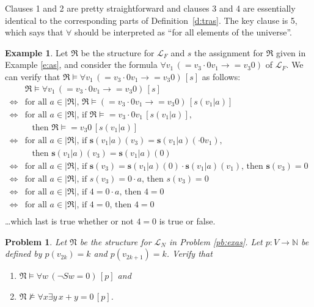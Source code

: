 \documentclass[12pt]{amsbook}
\newcommand{\nmodels}{\nvDash}
\theoremstyle{plain}
\newtheorem{prob}[thm]{Problem}
\theoremstyle{definition}
\newtheorem{exmp}{Example}[chapter]
\theoremstyle{remark}
\begin{document}
Clauses 1 and 2 are pretty straightforward and clauses 3 and 4 are essentially identical to the corresponding parts of Definition~\ref{d:tras}.  The key clause is 5,  which says that $\forall$ should be interpreted as ``for all elements of the universe''.  

\begin{exmp}
Let $\mathfrak{R}$ be the structure for $\mathcal{L}_F$ and $s$ the assignment for $\mathfrak{R}$ given in Example \ref{e:as},  and consider the formula $\forall v_1\, (= v_3 \cdot 0 v_1 \to = v_3 0)$ of $\mathcal{L}_F$.  We can verify that $\mathfrak{R} \models \forall v_1\, (= v_3 \cdot 0 v_1 \to = v_3 0) \, [s]$ as follows:
\[
\begin{aligned}
\mbox{} &\mathfrak{R} \models \forall v_1\, (= v_3 \cdot 0 v_1 \to = v_3 0) \, [s] \\
\iff &\text{for all $a \in |\mathfrak{R}|$,\ } \mathfrak{R} \models (= v_3 \cdot 0 v_1 \to = v_3 0) \, [s(v_1|a)]  \\
\iff &\text{for all $a \in |\mathfrak{R}|$, if $\mathfrak{R} \models  = v_3 \cdot 0 v_1 \, [s(v_1|a)]$,} \\
 & \;\;\; \text{then $\mathfrak{R} \models  = v_3 0 \, [s(v_1|a)]$} \\
\iff &\text{for all $a \in |\mathfrak{R}|$, if $\mathbf{s}(v_1|a)(v_3) = \mathbf{s}(v_1|a)(\cdot 0 v_1)$,} \\
 & \;\;\; \text{then $\mathbf{s}(v_1|a)(v_3) = \mathbf{s}(v_1|a)(0)$} \\
\iff &\text{for all $a \in |\mathfrak{R}|$,  if $\mathbf{s}(v_3) = \mathbf{s}(v_1|a)(0) \cdot \mathbf{s}(v_1|a)(v_1)$,  then $\mathbf{s}(v_3) = 0$} \\
\iff &\text{for all $a \in |\mathfrak{R}|$,  if $s(v_3) = 0 \cdot a$,  then $s(v_3) = 0$} \\
\iff &\text{for all $a \in |\mathfrak{R}|$,  if $4 = 0 \cdot a$,  then $4 = 0$} \\
\iff &\text{for all $a \in |\mathfrak{R}|$,  if $4 = 0$,  then $4 = 0$} \\
\end{aligned}
\]
\dots which last is true whether or not $4 = 0$ is true or false.
\end{exmp}

\begin{prob} \label{p:six4}
Let $\mathfrak{N}$ be the structure for $\mathcal{L}_N$ in Problem \ref{pb:exas}.  Let $p : V \to \mathbb{N}$ be defined by $p(v_{2k}) = k$ and $p(v_{2k+1}) = k$.  Verify that
\begin{enumerate}
\item $\mathfrak{N} \models \forall w \, (\lnot Sw = 0) \, [p]$ and 
\item $\mathfrak{N} \nmodels \forall x \exists y \, x + y = 0 \, [p]$.
\end{enumerate}
\end{prob}
\end{document}
